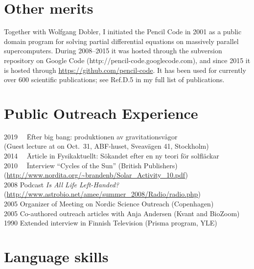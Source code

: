 \documentclass{article}
\begin{document}
\section*{Other merits}

Together with Wolfgang Dobler, I initiated the {\sc Pencil Code} in 2001
as a public domain program for solving partial differential equations
on massively parallel supercomputers.
During 2008--2015 it was hosted through the subversion repository on
Google Code (http://pencil-code.googlecode.com), and
since 2015 it is hosted through \url{https://github.com/pencil-code}.
It has been used for currently over 600 scientific publications; see Ref.D.5
in my full list of publications.

\section*{Public Outreach Experience}

\begin{tabbing}
2019 ~~\= Efter big bang: produktionen av gravitationsv{\aa}gor\\
       \> (Guest lecture at on Oct.\ 31, ABF-huset, Sveav\"agen 41, Stockholm)\\
2014 ~~\= Article in Fysikaktuellt: S\"okandet efter en ny teori f\"or solfl\"ackar\\
2010 ~~\= Interview ``Cycles of the Sun'' (British Publishers)\\
       \> (\url{http://www.nordita.org/~brandenb/Solar_Activity_10.pdf})\\
2008   \> Podcast {\it Is All Life Left-Handed?}\\
       \> (\url{http://www.astrobio.net/amee/summer_2008/Radio/radio.php})\\
2005   \> Organizer of Meeting on Nordic Science Outreach (Copenhagen) \\
2005   \> Co-authored outreach articles with Anja Andersen (Kvant and BioZoom)\\
1990   \> Extended interview in Finnish Television (Prisma program, YLE)\\
\end{tabbing}
\vspace{-8mm}

\section*{Language skills}
\end{document}
